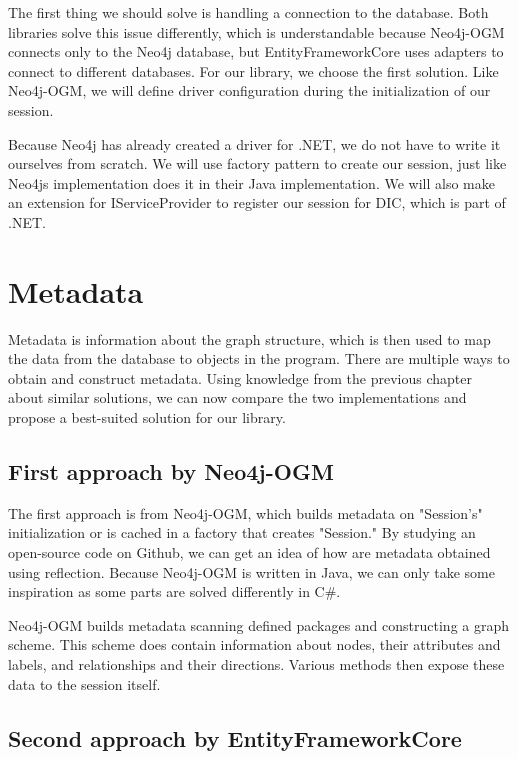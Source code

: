 The first thing we should solve is handling a connection to the database. Both libraries solve this issue differently, which is understandable because Neo4j-OGM connects only to the Neo4j database, but EntityFrameworkCore uses adapters to connect to different databases. For our library, we choose the first solution. Like Neo4j-OGM, we will define driver configuration during the initialization of our session.

Because Neo4j has already created a driver for .NET, we do not have to write it ourselves from scratch. We will use factory pattern  to create our session, just like Neo4js implementation does it in their Java implementation. We will also make an extension for IServiceProvider to register our session for DIC, which is part of .NET.

\section{Metadata}

Metadata is information about the graph structure, which is then used to map the data from the database to objects in the program. There are multiple ways to obtain and construct metadata. Using knowledge from the previous chapter about similar solutions, we can now compare the two implementations and propose a best-suited solution for our library.

\subsection{First approach by Neo4j-OGM}

The first approach is from Neo4j-OGM, which builds metadata on "Session's" initialization or is cached in a factory that creates "Session." By studying an open-source code on Github, we can get an idea of how are metadata obtained using reflection. Because Neo4j-OGM is written in Java, we can only take some inspiration as some parts are solved differently in C\#.

Neo4j-OGM builds metadata scanning defined packages and constructing a graph scheme. This scheme does contain information about nodes, their attributes and labels, and relationships and their directions. Various methods then expose these data to the session itself.

\subsection{Second approach by EntityFrameworkCore}


